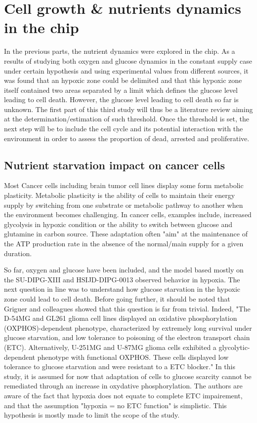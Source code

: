 \documentclass[11pt,a4paper]{article}
\begin{document}
\section{Cell growth \& nutrients dynamics in the chip}
In the previous parts, the nutrient dynamics were explored in the chip. As a results of studying both oxygen and glucose dynamics in the constant supply case under certain hypothesis and using experimental values from different sources, it was found that an hypoxic zone could be delimited and that this hypoxic zone itself contained two areas separated by a limit which defines the glucose level leading to cell death. However, the glucose level leading to cell death so far is unknown. The first part of this third study will thus be a literature review aiming at the determination/estimation of such threshold. Once the threshold is set, the next step will be to include the cell cycle and its potential interaction with the environment in order to assess the proportion of dead, arrested and proliferative.

\subsection{Nutrient starvation impact on cancer cells}
Most Cancer cells including brain tumor cell lines display some form metabolic plasticity. Metabolic plasticity is the ability of cells to maintain their energy supply by switching from one substrate or metabolic pathway to another when the environment becomes challenging.\cite{Venneti2016}\cite{DeBerardinis2008}\cite{Spinelli2018} In cancer cells, examples include, increased glycolysis in hypoxic condition or the ability to switch between glucose and glutamine in carbon source.\cite{Waker2018}\cite{Natarajan2019} These adaptation often "aim" at the maintenance of the ATP production rate in the absence of the normal/main supply for a given duration.\cite{Piannet1991}

So far, oxygen and glucose have been included, and the model based mostly on the SU-DIPG-XIII and HSIJD-DIPG-0013 observed behavior in hypoxia. The next question in line was to understand how glucose starvation in the hypoxic zone could lead to cell death. Before going further, it should be noted  that Griguer and colleagues showed that this question is far from trivial. Indeed, "The D-54MG and GL261 glioma cell lines displayed an oxidative phosphorylation (OXPHOS)-dependent phenotype, characterized by extremely long survival under glucose starvation, and low tolerance to poisoning of the electron transport chain (ETC). Alternatively, U-251MG and U-87MG glioma cells exhibited a glycolytic-dependent phenotype with functional OXPHOS. These cells displayed low tolerance to glucose starvation and were resistant to a ETC blocker."\cite {Griguer2005} In this study, it is assumed for now that adaptation of cells to glucose scarcity cannot be remediated through an increase in oxydative phosphorylation. The authors are aware of the fact that hypoxia does not equate to complete ETC impairement, and that the assumption "hypoxia = no ETC function" is simplistic.  This hypothesis is mostly made to limit the scope of the study. 
\end{document}
